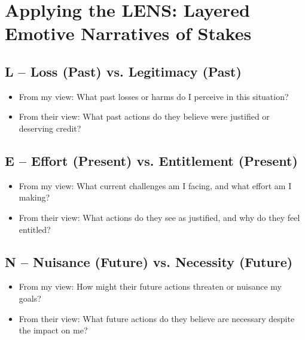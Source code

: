 \documentclass[11pt]{article}
\begin{document}
\section*{Applying the LENS: Layered Emotive Narratives of Stakes}

\subsection*{L – Loss (Past) vs. Legitimacy (Past)}

\begin{itemize}[noitemsep]
  \item From my view: What past losses or harms do I perceive in this situation?
  \item From their view: What past actions do they believe were justified or deserving credit?
\end{itemize}
\begin{answerbox}
\vspace{4em}
\end{answerbox}

\subsection*{E – Effort (Present) vs. Entitlement (Present)}

\begin{itemize}[noitemsep]
  \item From my view: What current challenges am I facing, and what effort am I making?
  \item From their view: What actions do they see as justified, and why do they feel entitled?
\end{itemize}
\begin{answerbox}
\vspace{4em}
\end{answerbox}

\subsection*{N – Nuisance (Future) vs. Necessity (Future)}

\begin{itemize}[noitemsep]
  \item From my view: How might their future actions threaten or nuisance my goals?
  \item From their view: What future actions do they believe are necessary despite the impact on me?
\end{itemize}
\begin{answerbox}
\vspace{4em}
\end{answerbox}
\end{document}
